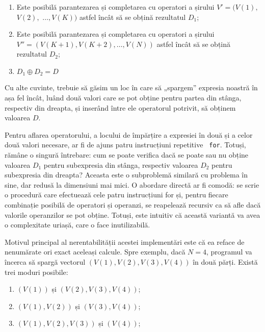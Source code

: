 \begin{enumerate}

\item Este posibilă parantezarea și completarea cu operatori a șirului $V' =
  (V(1),$ $V(2),$ $\dots, V(K))$ astfel încât să se obțină rezultatul $D_1$;

\item Este posibilă parantezarea și completarea cu operatori a șirului
  $V''=(V(K+1), V(K+2), \dots, V(N))$ astfel încât să se obțină rezultatul
  $D_2$;

\item $D_1 \oplus D_2 = D$

\end{enumerate}

Cu alte cuvinte, trebuie să găsim un loc în care să „spargem” expresia noastră
în așa fel încât, luând două valori care se pot obține pentru partea din
stânga, respectiv din dreapta, și inserând între ele operatorul potrivit, să
obținem valoarea $D$.

Pentru aflarea operatorului, a locului de împărțire a expresiei în două și a
celor două valori necesare, ar fi de ajuns patru instrucțiuni repetitive {\tt
  for}. Totuși, rămâne o singură întrebare: cum se poate verifica dacă se
poate sau nu obține valoarea $D_1$ pentru subexpresia din stânga, respectiv
valoarea $D_2$ pentru subexpresia din dreapta? Aceasta este o subproblemă
similară cu problema în sine, dar redusă la dimensiuni mai mici. O abordare
directă ar fi comodă: se scrie o procedură care efectuează cele patru
instrucțiuni for și, pentru fiecare combinație posibilă de operatori și
operanzi, se reapelează recursiv ca să afle dacă valorile operanzilor se pot
obține. Totuși, este intuitiv că această variantă va avea o complexitate
uriașă, care o face inutilizabilă.

Motivul principal al nerentabilității acestei implementări este că ea reface
de nenumărate ori exact aceleași calcule. Spre exemplu, dacă $N=4$, programul
va încerca să spargă vectorul $(V(1), V(2), V(3), V(4))$ în două părți. Există
trei moduri posibile:

\begin{enumerate}[label=(\alph*)]

\item $(V(1))$ și $(V(2), V(3), V(4))$;

\item $(V(1), V(2))$ și $(V(3), V(4))$;

\item $(V(1), V(2), V(3))$ și $(V(4))$;

\end{enumerate}


